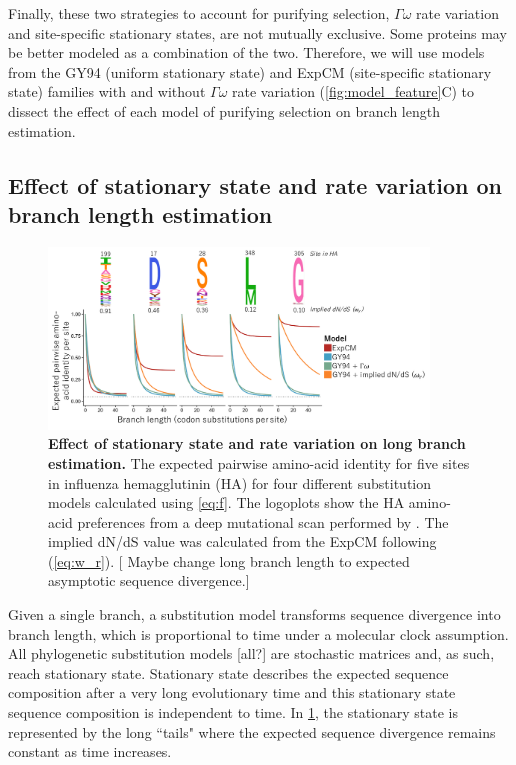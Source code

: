 \documentclass[11pt]{article}
\newcommand\skhcomment[1]{{\color{cyan}[#1]}}
\begin{document}
Finally, these two strategies to account for purifying selection, $\Gamma\omega$ rate variation and site-specific stationary states, are not mutually exclusive. 
Some proteins may be better modeled as a combination of the two. 
Therefore, we will use models from the GY94 (uniform stationary state) and ExpCM (site-specific stationary state) families with and without $\Gamma\omega$ rate variation (\ref{fig:model_feature}C) to dissect the effect of each model of purifying selection on branch length estimation. 

\subsection*{Effect of stationary state and rate variation on branch length estimation}

\begin{figure}[H]
\centerline{\includegraphics[width=0.90\textwidth]{figures/decay.pdf}}
\caption{\label{fig:decay}
\textbf{Effect of stationary state and rate variation on long branch estimation.}
The expected pairwise amino-acid identity for five sites in influenza hemagglutinin (HA) for four different substitution models calculated using \ref{eq:f}. 
The logoplots show the HA amino-acid preferences from a deep mutational scan performed by \cite{doud2016accurate}. 
The implied dN/dS value was calculated from the ExpCM following \cite{spielman2015relationship} (\ref{eq:w_r}).
\skhcomment{ Maybe change long branch length to expected asymptotic sequence divergence.}
}
\end{figure}

Given a single branch, a substitution model transforms sequence divergence into branch length, which is proportional to time under a molecular clock assumption. 
All phylogenetic substitution models \skhcomment{all?} are stochastic matrices and, as such, reach stationary state. 
Stationary state describes the expected sequence composition after a very long evolutionary time and this stationary state sequence composition is independent to time. 
In \ref{fig:decay}, the stationary state is represented by the long ``tails" where the expected sequence divergence remains constant as time increases. 
\end{document}
